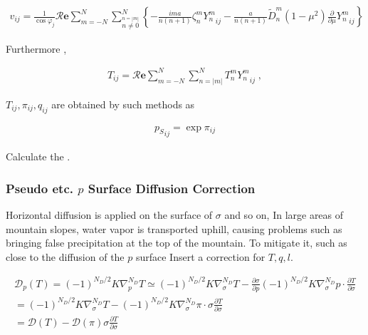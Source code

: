 \begin{eqnarray}
  v_{ij}
  =  \frac{1}{\cos \varphi_j}
     {\mathcal R}\mathbf{e} \sum_{m=-N}^{N}
                       \sum_{\stackrel{n=|m|}{n \neq 0}}^{N}
    \left\{
          -  \frac{im a}{n(n+1)} \zeta_n^m  {Y_n^m}_{ij}
          -  \frac{a}{n(n+1)} \tilde{D}_n^m 
            (1-\mu^{2}) \frac{\partial }{\partial \mu} {Y_n^m}_{ij}
    \right\}
\end{eqnarray}

Furthermore ,

\begin{eqnarray}
  T_{ij} 
   =  {\mathcal R}\mathbf{e} \sum_{m=-N}^{N} \sum_{n=|m|}^{N} 
      T_n^m  {Y_n^m}_{ij} \; ,
\end{eqnarray}

\(T_{ij}, \pi_{ij}, q_{ij}\) are obtained by such methods as

\begin{eqnarray}
  {p_S}_{ij} = \exp \pi_{ij} 
\end{eqnarray}

Calculate the .

\hypertarget{pseudo-etc.-p-surface-diffusion-correction}{%
\subsubsection{\texorpdfstring{Pseudo etc. \(p\) Surface Diffusion
Correction}{Pseudo etc. p Surface Diffusion Correction}}\label{pseudo-etc.-p-surface-diffusion-correction}}

Horizontal diffusion is applied on the surface of \(\sigma\) and so on,
In large areas of mountain slopes, water vapor is transported uphill,
causing problems such as bringing false precipitation at the top of the
mountain. To mitigate it, such as close to the diffusion of the \(p\)
surface Insert a correction for \(T,q,l\).

\begin{eqnarray}
  {\mathcal D}_p (T) = (-1)^{N_D/2} K \nabla^{N_D}_p T  
                \simeq  (-1)^{N_D/2} K \nabla^{N_D}_{\sigma} T  
                      - \frac{\partial \sigma}{\partial p} 
                      (-1)^{N_D/2} K \nabla^{N_D}_{\sigma} p
                      \cdot \frac{\partial T}{\partial \sigma}                   \\
                =      (-1)^{N_D/2} K \nabla^{N_D}_{\sigma} T  
                    -  (-1)^{N_D/2} K \nabla^{N_D}_{\sigma} \pi
                          \cdot \sigma \frac{\partial T}{\partial \sigma}  \\
                =    {\mathcal D} (T) 
                    -  {\mathcal D} (\pi) 
                       \sigma \frac{\partial T}{\partial \sigma}
\end{eqnarray}

